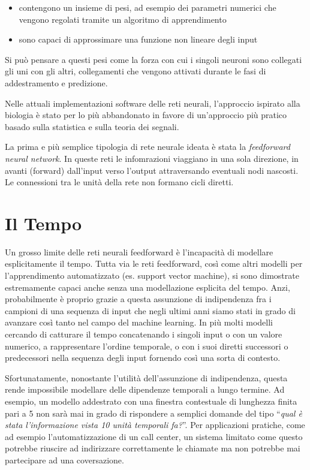 \begin{itemize}
  \item contengono un insieme di pesi, ad esempio dei parametri numerici che vengono regolati tramite un algoritmo di apprendimento
  \item sono capaci di approssimare una funzione non lineare degli input
\end{itemize}

Si pu\`o pensare a questi pesi come la forza con cui i singoli neuroni sono collegati gli uni con gli altri, collegamenti che vengono attivati durante le fasi di addestramento e predizione.

Nelle attuali implementazioni software delle reti neurali, l'approccio ispirato alla biologia \`e stato per lo pi\`u abbandonato in favore di un'approccio pi\`u pratico basado sulla statistica e sulla teoria dei segnali.

La prima e pi\`u semplice tipologia di rete neurale ideata \`e stata la \emph{feedforward neural network}.
In queste reti le infomrazioni viaggiano in una sola direzione, in avanti (forward) dall'input verso l'output attraversando eventuali nodi nascosti.
Le connessioni tra le unit\`a della rete non formano cicli diretti.


\section{Il Tempo} %
Un grosso limite delle reti neurali feedforward \`e l'incapacit\`a di modellare esplicitamente il tempo.
Tutta via le reti feedforward, cos\`i come altri modelli per l'apprendimento automatizzato (es. support vector machine), si sono dimostrate estremamente capaci anche senza una modellazione esplicita del tempo.
Anzi, probabilmente \`e proprio grazie a questa assunzione di indipendenza fra i campioni di una sequenza di input che negli ultimi anni siamo stati in grado di avanzare cos\`i tanto nel campo del machine learning.
In pi\`u molti modelli cercando di catturare il tempo concatenando i singoli input o con un valore numerico, a rappresentare l'ordine temporale, o con i suoi diretti successori o predecessori nella sequenza degli input fornendo cos\`i una sorta di contesto.

Sfortunatamente, nonostante l'utilit\`a dell'assunzione di indipendenza, questa rende impossibile modellare delle dipendenze temporali a lungo termine.
Ad esempio, un modello addestrato con una finestra contestuale di lunghezza finita pari a 5 non sar\`a mai in grado di rispondere a semplici domande del tipo ``\emph{qual \`e stata l'informazione vista 10 unit\`a temporali fa?}''.
Per applicazioni pratiche, come ad esempio l'automatizzazione di un call center, un sistema limitato come questo potrebbe riuscire ad indirizzare correttamente le chiamate ma non potrebbe mai partecipare ad una coversazione.

